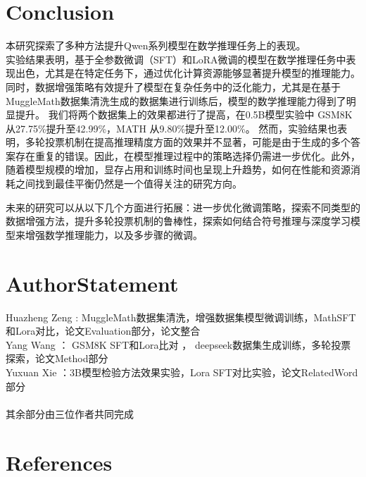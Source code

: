 \documentclass{article}
\begin{document}
  






\section{Conclusion}

本研究探索了多种方法提升Qwen系列模型在数学推理任务上的表现。\\
实验结果表明，基于全参数微调（SFT）和LoRA微调的模型在数学推理任务中表现出色，尤其是在特定任务下，通过优化计算资源能够显著提升模型的推理能力。同时，数据增强策略有效提升了模型在复杂任务中的泛化能力，尤其是在基于MuggleMath数据集清洗生成的数据集进行训练后，模型的数学推理能力得到了明显提升。
我们将两个数据集上的效果都进行了提高，在0.5B模型实验中 GSM8K 从27.75\%提升至42.99\%，MATH 从9.80\%提升至12.00\%。
然而，实验结果也表明，多轮投票机制在提高推理精度方面的效果并不显著，可能是由于生成的多个答案存在重复的错误。因此，在模型推理过程中的策略选择仍需进一步优化。此外，随着模型规模的增加，显存占用和训练时间也呈现上升趋势，如何在性能和资源消耗之间找到最佳平衡仍然是一个值得关注的研究方向。

未来的研究可以从以下几个方面进行拓展：进一步优化微调策略，探索不同类型的数据增强方法，提升多轮投票机制的鲁棒性，探索如何结合符号推理与深度学习模型来增强数学推理能力，以及多步骤的微调。

\section{AuthorStatement}

Huazheng Zeng : MuggleMath数据集清洗，增强数据集模型微调训练，MathSFT和Lora对比，论文Evaluation部分，论文整合\\
Yang Wang ： GSM8K SFT和Lora比对 ， deepseek数据集生成训练，多轮投票探索，论文Method部分\\
Yuxuan Xie ：3B模型检验方法效果实验，Lora SFT对比实验，论文RelatedWord部分\\
\\其余部分由三位作者共同完成




\section{References}
\end{document}
